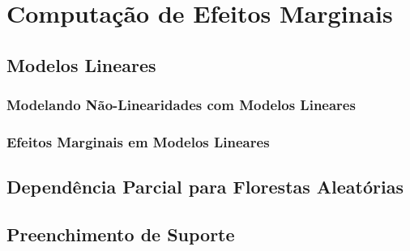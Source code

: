 
\chapter{Computação de Efeitos Marginais}
\section{Modelos Lineares}
\subsection{Modelando Não-Linearidades com Modelos Lineares}
\subsection{Efeitos Marginais em Modelos Lineares}
\section{Dependência Parcial para Florestas Aleatórias}
\section{Preenchimento de Suporte}